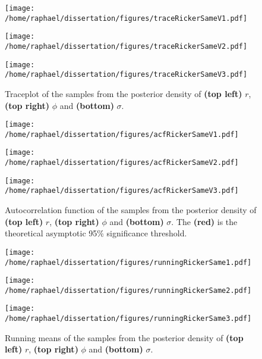 \documentclass[12pt]{article}
\begin{document}
	\begin{figure}[htb]
		\centering
		\begin{minipage}{0.4\textwidth}
			\centering
			\texttt{[image: /home/raphael/dissertation/figures/traceRickerSameV1.pdf]}
		\end{minipage}
		\begin{minipage}{0.4\textwidth}
			\centering
			\texttt{[image: /home/raphael/dissertation/figures/traceRickerSameV2.pdf]}
		\end{minipage}
		\begin{minipage}{0.4\textwidth}
			\centering
			\texttt{[image: /home/raphael/dissertation/figures/traceRickerSameV3.pdf]}
		\end{minipage}
		\caption{Traceplot of the samples from the posterior density of \textbf{(top left)} $r$, \textbf{(top right)} $\phi$ and \textbf{(bottom)} $\sigma$.}
		\label{fig:traceplotDiag}
	\end{figure}
	
	\begin{figure}[htb]
		\centering
		\begin{minipage}{0.4\textwidth}
			\centering
			\texttt{[image: /home/raphael/dissertation/figures/acfRickerSameV1.pdf]}
		\end{minipage}
		\begin{minipage}{0.4\textwidth}
			\centering
			\texttt{[image: /home/raphael/dissertation/figures/acfRickerSameV2.pdf]}
		\end{minipage}
		\begin{minipage}{0.4\textwidth}
			\centering
			\texttt{[image: /home/raphael/dissertation/figures/acfRickerSameV3.pdf]}
		\end{minipage}
		\caption{Autocorrelation function of the samples from the posterior density of \textbf{(top left)} $r$, \textbf{(top right)} $\phi$ and \textbf{(bottom)} $\sigma$. The \textbf{(red)} is the theoretical asymptotic 95\% significance threshold.}
		\label{fig:acfDiag}
	\end{figure}
	
	\begin{figure}[htb]
		\centering
		\begin{minipage}{0.4\textwidth}
			\centering
			\texttt{[image: /home/raphael/dissertation/figures/runningRickerSame1.pdf]}
		\end{minipage}
		\begin{minipage}{0.4\textwidth}
			\centering
			\texttt{[image: /home/raphael/dissertation/figures/runningRickerSame2.pdf]}
		\end{minipage}
		\begin{minipage}{0.4\textwidth}
			\centering
			\texttt{[image: /home/raphael/dissertation/figures/runningRickerSame3.pdf]}
		\end{minipage}
		\caption{Running means of the samples from the posterior density of \textbf{(top left)} $r$, \textbf{(top right)} $\phi$ and \textbf{(bottom)} $\sigma$.}
		\label{fig:rmDiag}
	\end{figure}
\end{document}
